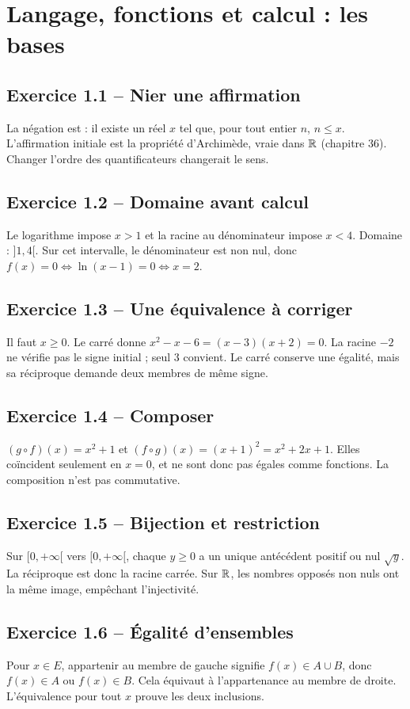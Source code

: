\chapter{Langage, fonctions et calcul : les bases}
\section*{Exercice 1.1 -- Nier une affirmation}
La négation est : il existe un réel $x$ tel que, pour tout entier $n$, $n\le x$. L'affirmation initiale est la propriété d'Archimède, vraie dans $\mathbb{R}$ (chapitre 36). Changer l'ordre des quantificateurs changerait le sens.

\section*{Exercice 1.2 -- Domaine avant calcul}
Le logarithme impose $x>1$ et la racine au dénominateur impose $x<4$. Domaine : $]1,4[$. Sur cet intervalle, le dénominateur est non nul, donc $f(x)=0\Leftrightarrow\ln(x-1)=0\Leftrightarrow x=2$.

\section*{Exercice 1.3 -- Une équivalence à corriger}
Il faut $x\ge0$. Le carré donne $x^2-x-6=(x-3)(x+2)=0$. La racine $-2$ ne vérifie pas le signe initial ; seul $3$ convient. Le carré conserve une égalité, mais sa réciproque demande deux membres de même signe.

\section*{Exercice 1.4 -- Composer}
$(g\circ f)(x)=x^2+1$ et $(f\circ g)(x)=(x+1)^2=x^2+2x+1$. Elles coïncident seulement en $x=0$, et ne sont donc pas égales comme fonctions. La composition n'est pas commutative.

\section*{Exercice 1.5 -- Bijection et restriction}
Sur $[0,+\infty[$ vers $[0,+\infty[$, chaque $y\ge0$ a un unique antécédent positif ou nul $\sqrt y$. La réciproque est donc la racine carrée. Sur $\mathbb{R}$, les nombres opposés non nuls ont la même image, empêchant l'injectivité.

\section*{Exercice 1.6 -- Égalité d’ensembles}
Pour $x\in E$, appartenir au membre de gauche signifie $f(x)\in A\cup B$, donc $f(x)\in A$ ou $f(x)\in B$. Cela équivaut à l'appartenance au membre de droite. L'équivalence pour tout $x$ prouve les deux inclusions.
